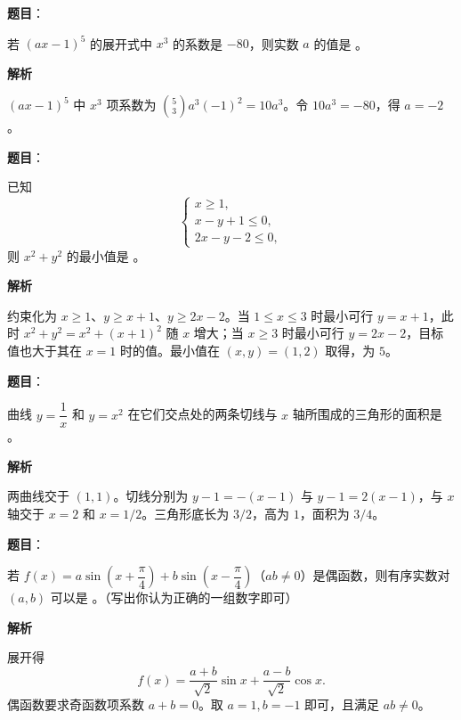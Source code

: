 \begin{answer}

\textbf{题目}：

若 $(ax-1)^5$ 的展开式中 $x^3$ 的系数是 $-80$，则实数 $a$ 的值是 \gkblank{}。

\textbf{解析}

$(ax-1)^5$ 中 $x^3$ 项系数为 $\binom53a^3(-1)^2=10a^3$。令 $10a^3=-80$，得 $a=-2$。


\end{answer}
\begin{answer}

\textbf{题目}：

已知
\nopagebreak[4]
\[
\begin{cases}
x\ge1,\\
x-y+1\le0,\\
2x-y-2\le0,
\end{cases}
\]
则 $x^2+y^2$ 的最小值是 \gkblank{}。

\textbf{解析}

约束化为 $x\ge1$、$y\ge x+1$、$y\ge2x-2$。当 $1\le x\le3$ 时最小可行 $y=x+1$，此时 $x^2+y^2=x^2+(x+1)^2$ 随 $x$ 增大；当 $x\ge3$ 时最小可行 $y=2x-2$，目标值也大于其在 $x=1$ 时的值。最小值在 $(x,y)=(1,2)$ 取得，为 $5$。


\end{answer}
\begin{answer}

\textbf{题目}：

曲线 $y=\dfrac1x$ 和 $y=x^2$ 在它们交点处的两条切线与 $x$ 轴所围成的三角形的面积是 \gkblank{}。

\textbf{解析}

两曲线交于 $(1,1)$。切线分别为 $y-1=-(x-1)$ 与 $y-1=2(x-1)$，与 $x$ 轴交于 $x=2$ 和 $x=1/2$。三角形底长为 $3/2$，高为 $1$，面积为 $3/4$。


\end{answer}
\begin{answer}

\textbf{题目}：

若 $f(x)=a\sin\left(x+\dfrac\pi4\right)+b\sin\left(x-\dfrac\pi4\right)$（$ab\ne0$）是偶函数，则有序实数对 $(a,b)$ 可以是 \gkblank{}。（写出你认为正确的一组数字即可）

\textbf{解析}

展开得
\nopagebreak[4]
\[
f(x)=\frac{a+b}{\sqrt2}\sin x+\frac{a-b}{\sqrt2}\cos x.
\]
偶函数要求奇函数项系数 $a+b=0$。取 $a=1,b=-1$ 即可，且满足 $ab\ne0$。


\end{answer}
